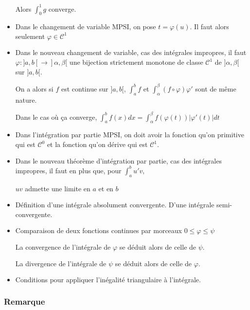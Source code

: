 \documentclass[a4paper, 11pt, hidelinks]{article}
\begin{document}
\begin{itemize}
    Alors $\displaystyle\int_0^1 g$ converge.
    \item Dans le changement de variable MPSI, on pose $t=\varphi (u)$. Il faut alors seulement $\varphi \in \mathscr{C}^1$
    \item Dans le nouveau changement de variable, cas des intégrales impropres, il faut $\varphi : ]a,b[ \to ]\alpha,\beta[$ une bijection strictement monotone
    de classe $\mathscr{C}^1$ de $]\alpha,\beta[$ sur $]a,b[$.
    
    On a alors si $f$ est continue sur $]a,b[$, $\displaystyle\int_a^b f$ et $\displaystyle\int_\alpha^\beta (f \circ \varphi)\varphi '$ sont de même nature.

    Dans le cas où ça converge, $\displaystyle\int_a^b f(x)dx=\displaystyle\int_\alpha^\beta f(\varphi(t))|\varphi '(t)|dt$
    \item Dans l'intégration par partie MPSI, on doit avoir la fonction qu'on primitive qui est $\mathscr{C}^0$ et la fonction qu'on dérive qui est $\mathscr{C}^1$.
    \item Dans le nouveau théorème d'intégration par partie, cas des intégrales impropres, il faut en plus que, pour $\displaystyle\int_a^b u'v$,
    
    $uv$ admette une limite en $a$ et en $b$
    \item Définition d'une intégrale absolument convergente. D'une intégrale semi-convergente.
    \item Comparaison de deux fonctions continues par morceaux $0\leq \varphi \leq \psi$
    
    La convergence de l'intégrale de $\varphi$ se déduit alors de celle de $\psi$.

    La divergence de l'intégrale de $\psi$ se déduit alors de celle de $\varphi$.
    \item Conditions pour appliquer l'inégalité triangulaire à l'intégrale.
\end{itemize}




\subsubsection{Remarque}
\end{document}
